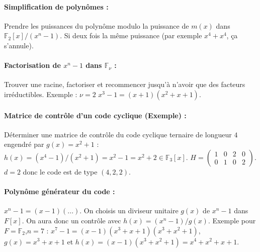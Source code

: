 \documentclass[11pt,a4paper]{report}
\newcommand{\f}{\mathbb{F}}
\begin{document}
\paragraph*{Simplification de polynômes :} Prendre les puissances du polynôme modulo la puissance de $m(x)$ dans $\f_2[x]/(x^n-1)$. Si deux fois la même puissance (par exemple $x^4 + x^4$, ça s'annule).

\paragraph*{Factorisation de $x^n-1$ dans $\f_\nu$ :} Trouver une racine, factoriser et recommencer jusqu'à n'avoir que des facteurs irréductibles. Exemple : $\nu=2$ $x^3-1=(x+1)(x^2+x+1)$.

\paragraph*{Matrice de contrôle d'un code cyclique (Exemple) :} Déterminer une matrice de contrôle du code cyclique ternaire de longueur $4$ engendré par $g(x)=x^2+1$ : $h(x)=(x^4-1)/(x^2+1)=x^2-1=x^2+2 \in \f_3[x]$. $H=\begin{pmatrix}1&0&2&0\\0&1&0&2\end{pmatrix}$. $d=2$ donc le code est de type $(4,2,2)$.

\paragraph*{Polynôme générateur du code :} $x^n-1 = (x-1)(...)$. On choisis un diviseur unitaire $g(x)$ de $x^n-1$ dans $F[x]$. On aura donc un contrôle avec $h(x)=(x^n-1)/g(x)$. Exemple pour $F=\mathbb{F}_2$,$n=7$ : $x^7-1 = (x-1)(x^3+x+1)(x^3+x^2+1)$, $g(x)=x^3+x+1$ et $h(x)=(x-1)(x^3+x^2+1)=x^4+x^2+x+1$. 
\end{document}
